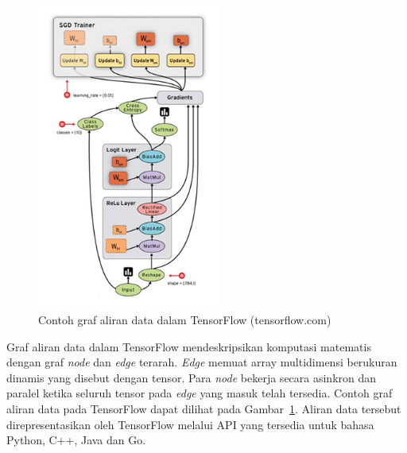 \begin{figure}
    \centering
    \includegraphics[width=6cm]{gambar/landasan-teori/tensorflow.jpg}
    \caption{Contoh graf aliran data dalam TensorFlow (tensorflow.com)}
    \label{gambar:tensorflow}
\end{figure}

Graf aliran data dalam TensorFlow mendeskripsikan komputasi matematis dengan graf \textit{node} dan \textit{edge} terarah. \textit{Edge} memuat array multidimensi berukuran dinamis yang disebut dengan tensor. Para \textit{node} bekerja secara asinkron dan paralel ketika seluruh tensor pada \textit{edge} yang masuk telah tersedia. Contoh graf aliran data pada TensorFlow dapat dilihat pada Gambar~\ref{gambar:tensorflow}. Aliran data tersebut direpresentasikan oleh TensorFlow melalui API yang tersedia untuk bahasa Python, C++, Java dan Go.


